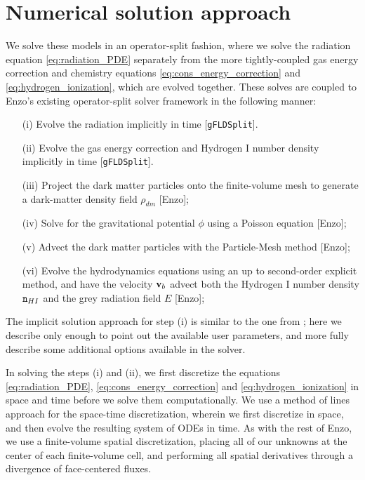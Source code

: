 \documentclass[letterpaper,10pt]{article}
\renewcommand{\(}{\left(}
\renewcommand{\)}{\right)}
\newcommand{\vb}{{\bf v}_b}
\newcommand{\mn}{{\tt n}}
\begin{document}
\section{Numerical solution approach}
\label{sec:solution_approach}

We solve these models in an operator-split fashion, where we solve
the radiation equation \eqref{eq:radiation_PDE} separately from the
more tightly-coupled gas energy correction and chemistry equations
\eqref{eq:cons_energy_correction} and \eqref{eq:hydrogen_ionization},
which are evolved together.  These solves are coupled to Enzo's
existing operator-split solver framework in the following manner:
\begin{itemize}
\item[(i)] Evolve the radiation implicitly in time [{\tt gFLDSplit}].
\item[(ii)] Evolve the gas energy correction and Hydrogen I number
  density implicitly in time [{\tt gFLDSplit}]. 
\item[(iii)] Project the dark matter particles onto the finite-volume
  mesh to generate a dark-matter density field $\rho_{dm}$ [Enzo];
\item[(iv)] Solve for the gravitational potential $\phi$ using a
  Poisson equation [Enzo];
\item[(v)] Advect the dark matter particles with the Particle-Mesh
  method [Enzo];
\item[(vi)] Evolve the hydrodynamics equations using an up to
  second-order explicit method, and have the velocity $\vb$ advect
  both the Hydrogen I number density $\mn_{HI}$ and the grey radiation
  field $E$ [Enzo]; 
\end{itemize}

The implicit solution approach for step (i) is similar to the one from 
\cite{ReynoldsHayesPaschosNorman2009}; here we describe only enough
to point out the available user parameters, and more fully describe
some additional options available in the solver.

In solving the steps (i) and (ii), we first discretize the
equations \eqref{eq:radiation_PDE}, \eqref{eq:cons_energy_correction}
and \eqref{eq:hydrogen_ionization} in space and time before we solve
them computationally.  We use a method of lines approach for the
space-time discretization, wherein we first discretize in space, and
then evolve the resulting system of ODEs in time.  As with the rest of
Enzo, we use a finite-volume spatial discretization, placing all of
our unknowns at the center of each finite-volume cell, and performing
all spatial derivatives through a divergence of face-centered fluxes.
\end{document}
